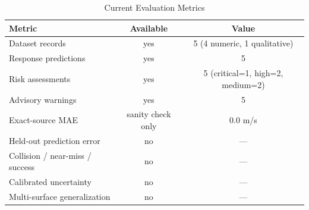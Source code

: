 ﻿\begin{table}[htbp]
\centering
\caption{Current Evaluation Metrics}
\label{tab:metrics}
\begin{tabular}{lcc}
\hline
Metric & Available & Value \\
\hline
Dataset records & yes & 5 (4 numeric, 1 qualitative) \\
Response predictions & yes & 5 \\
Risk assessments & yes & 5 (critical=1, high=2, medium=2) \\
Advisory warnings & yes & 5 \\
Exact-source MAE & sanity check only & 0.0 m/s \\
\hline
Held-out prediction error & no & --- \\
Collision / near-miss / success & no & --- \\
Calibrated uncertainty & no & --- \\
Multi-surface generalization & no & --- \\
\hline
\end{tabular}
\end{table}
